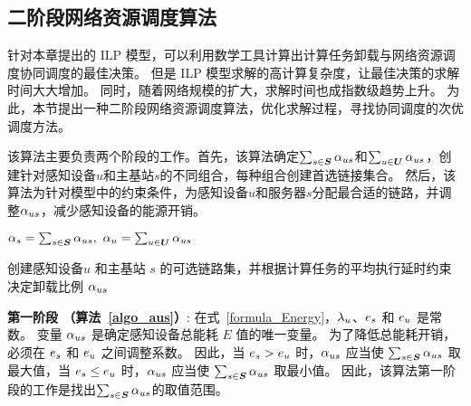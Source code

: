 \subsection{二阶段网络资源调度算法}

针对本章提出的 ILP 模型，可以利用数学工具计算出计算任务卸载与网络资源调度协同调度的最佳决策。
但是 ILP 模型求解的高计算复杂度，让最佳决策的求解时间大大增加。
同时，随着网络规模的扩大，求解时间也成指数级趋势上升。
为此，本节提出一种二阶段网络资源调度算法，优化求解过程，寻找协同调度的次优调度方法。

该算法主要负责两个阶段的工作。首先，该算法确定$\sum_{s \in \boldsymbol{S}}{\alpha}_{us}$和$\sum_{u \in \boldsymbol{U}}{\alpha}_{us}$，创建针对感知设备$u$和主基站$s$的不同组合，每种组合创建首选链接集合。
然后，该算法为针对模型中的约束条件，为感知设备$u$和服务器$s$分配最合适的链路，并调整${\alpha}_{us}$，减少感知设备的能源开销。

\begin{algorithm}[!b]
\setstretch{\algostretch}
${\alpha}_{s} = \sum_{s \in \boldsymbol{S}}{\alpha}_{us}, \  {\alpha}_{u} = \sum_{u \in \boldsymbol{U}}{\alpha}_{us}$\\
\KwOut{$\aus, \au, \Lus$}
\caption{创建感知设备$u$ 和主基站 $s$ 的可选链路集，并根据计算任务的平均执行延时约束决定卸载比例 ${\alpha}_{us}$}
\label{algo_aus}
\end{algorithm}

\textbf{第一阶段 （算法~\ref{algo_aus}）}:
在式~\eqref{formula_Energy}，${\lambda}_{u}$、$e_s$ 和 $e_u$ 是常数。
变量 ${\alpha}_{us}$ 是确定感知设备总能耗 $E$ 值的唯一变量。
为了降低总能耗开销，必须在 $e_s$ 和 $e_u$ 之间调整系数。
因此，当 $e_s > e_u$ 时，${\alpha}_{us}$ 应当使 $\sum_{s \in \boldsymbol{S}}{{\alpha}_{us}}$ 取最大值，当 $e_s \leq e_u$ 时，${\alpha}_{us}$ 应当使 $\sum_{s \in \boldsymbol{S}}{{\alpha}_{us}}$ 取最小值。
因此，该算法第一阶段的工作是找出$\sum_{s \in \boldsymbol{S}}{\alpha}_{us}$的取值范围。

